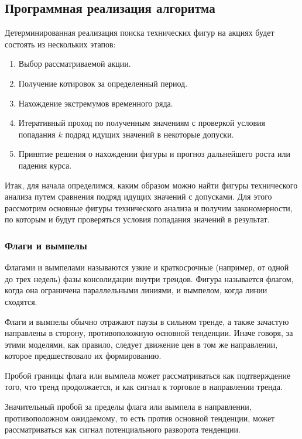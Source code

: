 \documentclass[bachelor, och, coursework]{SCWorks}
\begin{document}
    \subsection{Программная реализация алгоритма}
    
    Детерминированная реализация поиска технических фигур на акциях будет
    состоять из нескольких этапов:
    \begin{enumerate}
        \item Выбор рассматриваемой акции.
        \item Получение котировок за определенный период.
        \item Нахождение экстремумов временного ряда.
        \item Итеративный проход по полученным значениям с проверкой условия
        попадания $k$ подряд идущих значений в некоторые допуски.
        \item Принятие решения о нахождении фигуры и прогноз дальнейшего роста
        или падения курса.
    \end{enumerate}
          
    
    Итак, для начала определимся, каким образом можно найти фигуры технического
    анализа путем сравнения подряд идущих значений с допусками. Для этого
    рассмотрим основные фигуры технического анализа и получим закономерности, по
    которым и будут проверяться условия попадания значений в результат.
    
    \subsubsection{Флаги и вымпелы}

    Флагами и вымпелами называются узкие и краткосрочные (например, от одной до
    трех недель) фазы консолидации внутри трендов. Фигура называется флагом,
    когда она ограничена параллельными линиями, и вымпелом, когда линии
    сходятся. 

    Флаги и вымпелы обычно отражают паузы в сильном тренде, а также зачастую
    направлены в сторону, противоположную основной тенденции. Иначе говоря, за
    этими моделями, как правило, следует движение цен в том же направлении,
    которое предшествовало их формированию.

    Пробой границы флага или вымпела может рассматриваться как подтверждение
    того, что тренд продолжается, и как сигнал к торговле в направлении тренда. 

    Значительный пробой за пределы флага или вымпела в направлении,
    противоположном ожидаемому, то есть против основной тенденции, может
    рассматриваться как сигнал потенциального разворота тенденции. 
\end{document}
